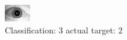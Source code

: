 \begin{figure}[h!]
\begin{center}
\includegraphics[width=0.60\columnwidth]{figures/ID1713_class_3_target_2.png}
\end{center}
\caption{ Classification: 3 actual target: 2}
\label{fig:ID1713_class_3_target_2}
\end{figure}
